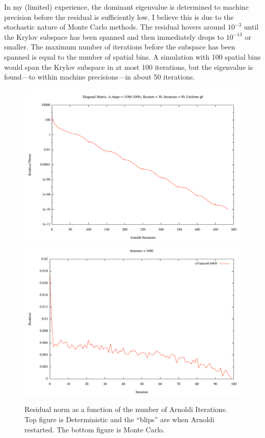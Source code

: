 \documentclass[12pt]{article}
\begin{document}
In my (limited) experience, the dominant eigenvalue is determined to machine precision before the residual is sufficiently low.  I believe this is due to the stochastic nature of Monte Carlo methods.  The residual hovers around $10^{-3}$ until the Krylov subspace has been spanned and then immediately drops to $10^{-13}$ or smaller.  The maximum number of iterations before the subspace has been spanned is equal to the number of spatial bins.  A simulation with 100 spatial bins would span the Krylov subspace in at most 100 iterations, but the eigenvalue is found---to within machine precisions---in about 50 iterations.
\begin{figure}[h]\centering
    \includegraphics[width=5in, keepaspectratio]{ArnoldiDtmResidual.pdf}
    \includegraphics[width=5in, keepaspectratio]{ArnoldiMCResidual.pdf}
    \caption{Residual norm as a function of the number of Arnoldi Iterations.  Top figure is Deterministic and the ``blips'' are when Arnoldi restarted.  The bottom figure is Monte Carlo.}
    \label{fig:Residual}
\end{figure}
\end{document}
